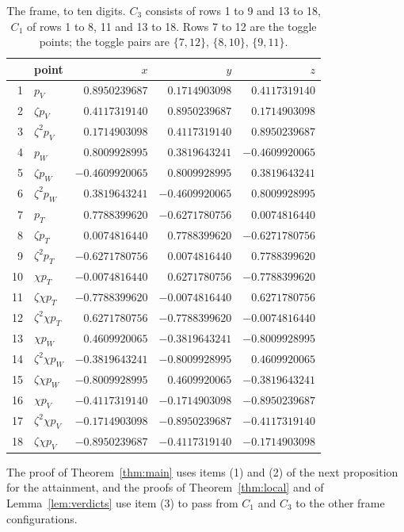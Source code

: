 \documentclass[12pt]{amsart}
\theoremstyle{definition}
\theoremstyle{plain}
\theoremstyle{definition}
\newcommand{\CI}{C_1}
\newcommand{\CIII}{C_3}
\begin{document}
\begin{table}[ht]
\caption{The frame, to ten digits. $\CIII$ consists of rows 1 to 9 and 13 to 18, $\CI$ of rows 1 to 8, 11 and 13 to 18. Rows 7 to 12 are the toggle points; the toggle pairs are $\{7,12\}$, $\{8,10\}$, $\{9,11\}$.}\label{tab:frame}
\centering\small
\begin{tabular}{rlrrr}
 & point & $x$ & $y$ & $z$\\\hline
1 & $p_V$ & $0.8950239687$ & $0.1714903098$ & $0.4117319140$\\
2 & $\zeta p_V$ & $0.4117319140$ & $0.8950239687$ & $0.1714903098$\\
3 & $\zeta^2p_V$ & $0.1714903098$ & $0.4117319140$ & $0.8950239687$\\
4 & $p_W$ & $0.8009928995$ & $0.3819643241$ & $-0.4609920065$\\
5 & $\zeta p_W$ & $-0.4609920065$ & $0.8009928995$ & $0.3819643241$\\
6 & $\zeta^2p_W$ & $0.3819643241$ & $-0.4609920065$ & $0.8009928995$\\
7 & $p_T$ & $0.7788399620$ & $-0.6271780756$ & $0.0074816440$\\
8 & $\zeta p_T$ & $0.0074816440$ & $0.7788399620$ & $-0.6271780756$\\
9 & $\zeta^2p_T$ & $-0.6271780756$ & $0.0074816440$ & $0.7788399620$\\
10 & $\chi p_T$ & $-0.0074816440$ & $0.6271780756$ & $-0.7788399620$\\
11 & $\zeta\chi p_T$ & $-0.7788399620$ & $-0.0074816440$ & $0.6271780756$\\
12 & $\zeta^2\chi p_T$ & $0.6271780756$ & $-0.7788399620$ & $-0.0074816440$\\
13 & $\chi p_W$ & $0.4609920065$ & $-0.3819643241$ & $-0.8009928995$\\
14 & $\zeta^2\chi p_W$ & $-0.3819643241$ & $-0.8009928995$ & $0.4609920065$\\
15 & $\zeta\chi p_W$ & $-0.8009928995$ & $0.4609920065$ & $-0.3819643241$\\
16 & $\chi p_V$ & $-0.4117319140$ & $-0.1714903098$ & $-0.8950239687$\\
17 & $\zeta^2\chi p_V$ & $-0.1714903098$ & $-0.8950239687$ & $-0.4117319140$\\
18 & $\zeta\chi p_V$ & $-0.8950239687$ & $-0.4117319140$ & $-0.1714903098$
\end{tabular}
\end{table}

The proof of Theorem~\ref{thm:main} uses items (1) and (2) of the next proposition for the attainment, and the proofs of Theorem~\ref{thm:local} and of Lemma~\ref{lem:verdicts} use item (3) to pass from $\CI$ and $\CIII$ to the other frame configurations.
\end{document}
